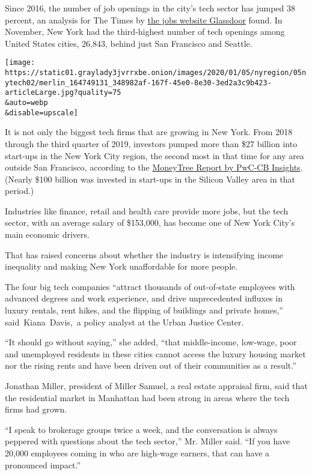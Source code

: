 Since 2016, the number of job openings in the city's tech sector has
jumped 38 percent, an analysis for The Times by
\href{http://www.glassdoor.com/}{the jobs website Glassdoor} found. In
November, New York had the third-highest number of tech openings among
United States cities, 26,843, behind just San Francisco and Seattle.

\texttt{[image: https://static01.graylady3jvrrxbe.onion/images/2020/01/05/nyregion/05nytech02/merlin\_164749131\_348982af-167f-45e0-8e30-3ed2a3c9b423-articleLarge.jpg?quality=75\\\&auto=webp\\\&disable=upscale]}

It is not only the biggest tech firms that are growing in New York. From
2018 through the third quarter of 2019, investors pumped more than \$27
billion into start-ups in the New York City region, the second most in
that time for any area outside San Francisco, according to the
\href{https://www.pwc.com/us/en/moneytree-report/assets/moneytree-report-q3-2019.pdf}{MoneyTree
Report by PwC-CB Insights}. (Nearly \$100 billion was invested in
start-ups in the Silicon Valley area in that period.)

Industries like finance, retail and health care provide more jobs, but
the tech sector, with an average salary of \$153,000, has become one of
New York City's main economic drivers.

That has raised concerns about whether the industry is intensifying
income inequality and making New York unaffordable for more people.

The four big tech companies ``attract thousands of out-of-state
employees with advanced degrees and work experience, and drive
unprecedented influxes in luxury rentals, rent hikes, and the flipping
of buildings and private homes,'' said~Kiana~Davis,~a policy analyst at
the Urban Justice Center.

``It should go without saying,'' she added, ``that middle-income,
low-wage, poor and unemployed residents in these cities cannot access
the luxury housing market nor the rising rents and have been driven out
of their communities as a result.''

Jonathan Miller, president of Miller Samuel, a real estate appraisal
firm, said that the residential market in Manhattan had been strong in
areas where the tech firms had grown.

``I speak to brokerage groups twice a week, and the conversation is
always peppered with questions about the tech sector,'' Mr. Miller said.
``If you have 20,000 employees coming in who are high-wage earners, that
can have a pronounced impact.''

